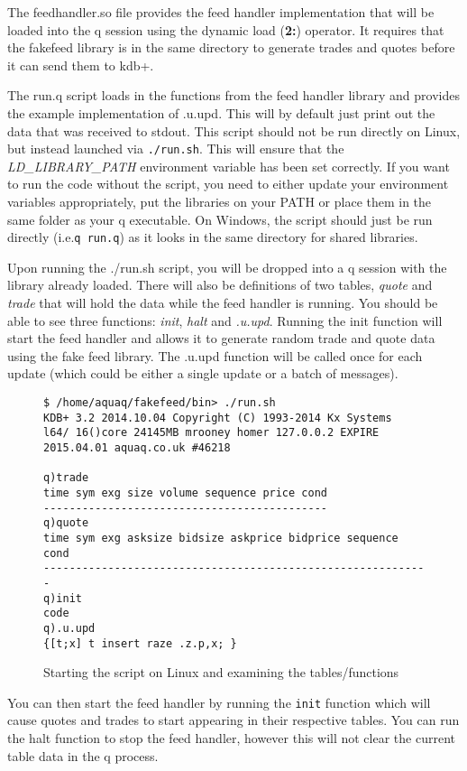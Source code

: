 The feedhandler.so file provides the feed handler implementation that will be loaded into the q session using the
dynamic load (\textbf{2:}) operator. It requires that the fakefeed library is in the same directory to generate
trades and quotes before it can send them to kdb+.

The run.q script loads in the functions from the feed handler library and provides the example implementation
of .u.upd. This will by default just print out the data that was received to stdout.
This script should not be run directly on Linux, but instead launched via \verb|./run.sh|. This will ensure
that the \textit{LD\_LIBRARY\_PATH} environment variable has been set correctly. If you want to run
the code without the script, you need to either update your environment variables appropriately, put
the libraries on your PATH or place them in the same folder as your q executable. On Windows, the script should
just be run directly (i.e.\verb|q run.q|) as it looks in the same directory for shared libraries.

Upon running the ./run.sh script, you will be dropped into a q session with the library already loaded.
There will also be definitions of two tables, \textit{quote} and \textit{trade} that will hold the data 
while the feed handler is running.  You should be able to see three functions: \textit{init}, \textit{halt} and
\textit{.u.upd}. Running the init function will start the feed handler and allows it to generate random trade and
quote data using the fake feed library. The .u.upd function will be called once for each update (which could be
either a single update or a batch of messages).

\begin{figure}
\begin{lstlisting}
$ /home/aquaq/fakefeed/bin> ./run.sh
KDB+ 3.2 2014.10.04 Copyright (C) 1993-2014 Kx Systems
l64/ 16()core 24145MB mrooney homer 127.0.0.2 EXPIRE 2015.04.01 aquaq.co.uk #46218

q)trade
time sym exg size volume sequence price cond
--------------------------------------------
q)quote
time sym exg asksize bidsize askprice bidprice sequence cond
------------------------------------------------------------
q)init
code
q).u.upd
{[t;x] t insert raze .z.p,x; }
\end{lstlisting}
\caption{Starting the script on Linux and examining the tables/functions}
\end{figure}

You can then start the feed handler by running the \verb|init| function which will cause quotes and trades to start
appearing in their respective tables. You can run the halt function to stop the feed handler, however this will
not clear the current table data in the q process.

